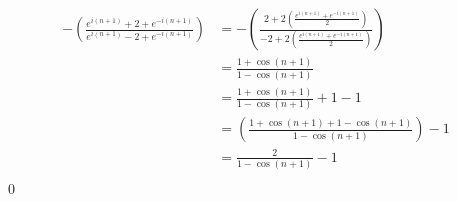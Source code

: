 \documentclass{letter}
\begin{document}
\begin{letter}{}
  \begin{align*}
    -\left(\displaystyle\frac{
      e^{i(n+1)}
      +2
      +e^{-i (n+1)}
    }{
      e^{i(n+1)}
      -2
      +e^{-i (n+1)}
    }
    \right)
    &=
    -\left(\displaystyle\frac{
      2+2\left(\displaystyle\frac{
        e^{i(n+1)} +e^{-i (n+1)}}{2}\right)
    }{
      -2
        +2\left(\displaystyle\frac{e^{i(n+1)} +e^{-i (n+1)}}{2}\right)
    }
    \right)\\
    &=\displaystyle\frac{1+\cos(n+1)}{1-\cos(n+1)}\\
    &=\displaystyle\frac{1+\cos(n+1)}{1-\cos(n+1)}+1-1\\
    &=\left(\displaystyle\frac{1+\cos(n+1)+1-\cos(n+1)}{1-\cos(n+1)}\right)-1\\
    &=\frac{2}{1-\cos(n+1)}-1\\
  \end{align*}
  \qed


\end{letter}
\end{document}

